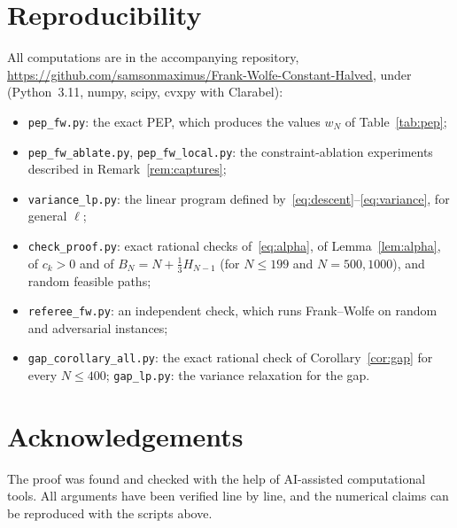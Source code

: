 \documentclass[11pt]{article}
\theoremstyle{remark}
\begin{document}
\section*{Reproducibility}
All computations are in the accompanying repository,
\url{https://github.com/samsonmaximus/Frank-Wolfe-Constant-Halved}, under
 (Python~3.11, numpy, scipy, cvxpy
with Clarabel):
\begin{itemize}
  \item \texttt{pep\_fw.py}: the exact PEP, which produces the values $w_N$ of
  Table~\ref{tab:pep};
  \item \texttt{pep\_fw\_ablate.py}, \texttt{pep\_fw\_local.py}: the
  constraint-ablation experiments described in Remark~\ref{rem:captures};
  \item \texttt{variance\_lp.py}: the linear program defined
  by~\eqref{eq:descent}--\eqref{eq:variance}, for general $\ell$;
  \item \texttt{check\_proof.py}: exact rational checks of~\eqref{eq:alpha}, of
  Lemma~\ref{lem:alpha}, of $c_k>0$ and of $B_N=N+\frac13H_{N-1}$ (for $N\le199$
  and $N=500,1000$), and random feasible paths;
  \item \texttt{referee\_fw.py}: an independent check, which runs Frank--Wolfe on
  random and adversarial instances;
  \item \texttt{gap\_corollary\_all.py}: the exact rational check of
  Corollary~\ref{cor:gap} for every $N\le400$; \texttt{gap\_lp.py}: the variance
  relaxation for the gap.
\end{itemize}

\section*{Acknowledgements}
The proof was found and checked with the help of AI-assisted computational tools.
All arguments have been verified line by line, and the numerical claims can be
reproduced with the scripts above.
\end{document}
